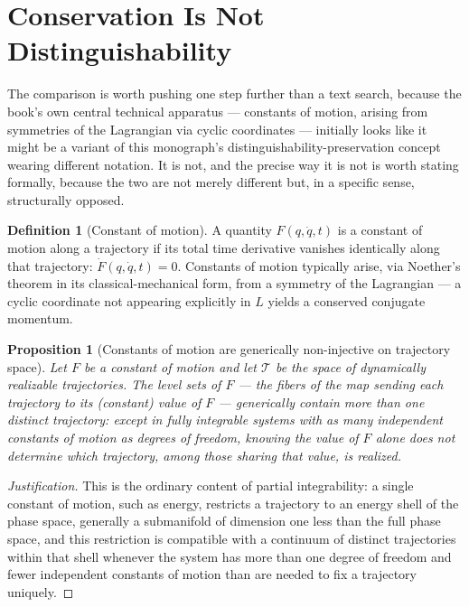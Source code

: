 \documentclass[11pt]{book}
\theoremstyle{plain}
\newtheorem{proposition}[theorem]{Proposition}
\theoremstyle{definition}
\newtheorem{definition}[theorem]{Definition}
\theoremstyle{remark}
\begin{document}
\section{Conservation Is Not Distinguishability}

The comparison is worth pushing one step further than a text search,
because the book's own central technical apparatus --- constants of
motion, arising from symmetries of the Lagrangian via cyclic
coordinates --- initially looks like it might be a variant of this
monograph's distinguishability-preservation concept wearing different
notation. It is not, and the precise way it is not is worth stating
formally, because the two are not merely different but, in a specific
sense, structurally opposed.

\begin{definition}[Constant of motion]
\label{def:constant-of-motion}
A quantity $F(q, \dot q, t)$ is a constant of motion along a
trajectory if its total time derivative vanishes identically along
that trajectory: $\dot F(q, \dot q, t) = 0$. Constants of motion
typically arise, via Noether's theorem in its classical-mechanical
form, from a symmetry of the Lagrangian --- a cyclic coordinate not
appearing explicitly in $L$ yields a conserved conjugate momentum.
\end{definition}

\begin{proposition}[Constants of motion are generically non-injective on trajectory space]
\label{prop:conservation-noninjective}
Let $F$ be a constant of motion and let $\mathcal{T}$ be the space of
dynamically realizable trajectories. The level sets of $F$ --- the
fibers of the map sending each trajectory to its (constant) value of
$F$ --- generically contain more than one distinct trajectory: except
in fully integrable systems with as many independent constants of
motion as degrees of freedom, knowing the value of $F$ alone does not
determine which trajectory, among those sharing that value, is
realized.
\end{proposition}

\begin{proof}[Justification]
This is the ordinary content of partial integrability: a single
constant of motion, such as energy, restricts a trajectory to an
energy shell of the phase space, generally a submanifold of dimension
one less than the full phase space, and this restriction is
compatible with a continuum of distinct trajectories within that
shell whenever the system has more than one degree of freedom and
fewer independent constants of motion than are needed to fix a
trajectory uniquely.
\end{proof}
\end{document}
